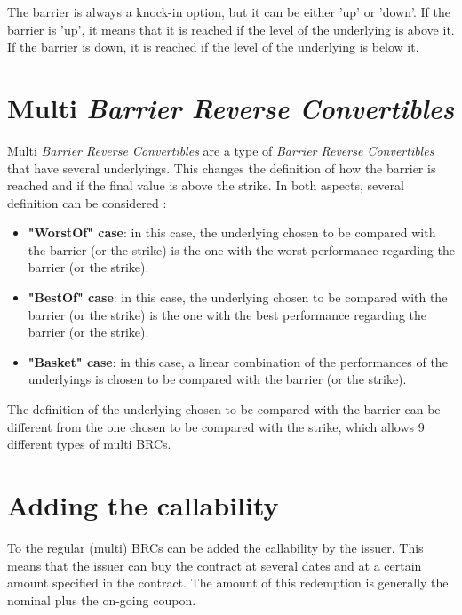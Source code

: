 \documentclass[a4paper,11pt,english]{book}
\begin{document}
The barrier is always a knock-in option, but it can be either 'up' or 'down'. If the barrier is 'up', it means that it is reached if the level of the underlying is above it. If the barrier is down, it is reached if the level of the underlying is below it.

\section{Multi \textit{Barrier Reverse Convertibles}}
\label{sec:multi-BRC-definition}
Multi \textit{Barrier Reverse Convertibles} are a type of \textit{Barrier Reverse Convertibles} that have several underlyings. This changes the definition of how the barrier is reached and if the final value is above the strike. In both aspects, several definition can be considered :

\begin{itemize}
    \item \textbf{"WorstOf" case}: in this case, the underlying chosen to be compared with the barrier (or the strike) is the one with the worst performance regarding the barrier (or the strike).
    \item \textbf{"BestOf" case}: in this case, the underlying chosen to be compared with the barrier (or the strike) is the one with the best performance regarding the barrier (or the strike).
    \item \textbf{"Basket" case}: in this case, a linear combination of the performances of the underlyings is chosen to be compared with the barrier (or the strike).
\end{itemize}

The definition of the underlying chosen to be compared with the barrier can be different from the one chosen to be compared with the strike, which allows 9 different types of multi BRCs.

\section{Adding the callability}
To the regular (multi) BRCs can be added the callability by the issuer. This means that the issuer can buy the contract at several dates and at a certain amount specified in the contract. The amount of this redemption is generally the nominal plus the on-going coupon.

\end{document}
